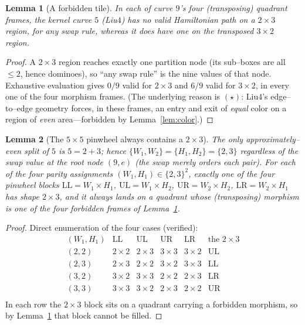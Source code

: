 \documentclass[11pt]{article}
\newtheorem{lemma}{Lemma}
\theoremstyle{definition}
\newcommand{\LL}{\mathrm{LL}}
\newcommand{\UL}{\mathrm{UL}}
\newcommand{\UR}{\mathrm{UR}}
\newcommand{\LR}{\mathrm{LR}}
\begin{document}
\begin{lemma}[A forbidden tile]\label{lem:9A}
In each of curve $9$'s four (transposing) quadrant frames, the kernel curve $5$ (Liu$4$)
has \emph{no} valid Hamiltonian path on a $2\times3$ region, for any swap rule, whereas it
\emph{does} have one on the transposed $3\times2$ region.
\end{lemma}
\begin{proof}
A $2\times3$ region reaches exactly one partition node (its sub--boxes are all $\le2$, hence
dominoes), so ``any swap rule'' is the nine values of that node. Exhaustive evaluation gives
$0/9$ valid for $2\times3$ and $6/9$ valid for $3\times2$, in every one of the four
morphism frames. (The underlying reason is $(\star)$: Liu$4$'s edge--to--edge geometry
forces, in these frames, an entry and exit of \emph{equal} color on a region of \emph{even}
area---forbidden by Lemma~\ref{lem:color}.)
\end{proof}

\begin{lemma}[The $5\times5$ pinwheel always contains a $2\times3$]\label{lem:9B}
The only approximately--even split of $5$ is $5=2+3$; hence $\{W_1,W_2\}=\{H_1,H_2\}=\{2,3\}$
regardless of the swap value at the root node $(9,e)$ (the swap merely orders each pair).
For each of the four parity assignments $(W_1,H_1)\in\{2,3\}^2$, exactly one of the four
pinwheel blocks $\LL=W_1\!\times\!H_1$, $\UL=W_1\!\times\!H_2$, $\UR=W_2\!\times\!H_2$,
$\LR=W_2\!\times\!H_1$ has shape $2\times3$, and it always lands on a quadrant whose
(transposing) morphism is one of the four forbidden frames of Lemma~\ref{lem:9A}.
\end{lemma}
\begin{proof}
Direct enumeration of the four cases (verified):
\[
\begin{array}{c|cccc|c}
(W_1,H_1) & \LL & \UL & \UR & \LR & \text{the }2\times3\\\hline
(2,2) & 2\!\times\!2 & 2\!\times\!3 & 3\!\times\!3 & 3\!\times\!2 & \UL\\
(2,3) & 2\!\times\!3 & 2\!\times\!2 & 3\!\times\!2 & 3\!\times\!3 & \LL\\
(3,2) & 3\!\times\!2 & 3\!\times\!3 & 2\!\times\!2 & 2\!\times\!3 & \LR\\
(3,3) & 3\!\times\!3 & 3\!\times\!2 & 2\!\times\!3 & 2\!\times\!2 & \UR\\
\end{array}
\]
In each row the $2\times3$ block sits on a quadrant carrying a forbidden morphism, so by
Lemma~\ref{lem:9A} that block cannot be filled.
\end{proof}
\end{document}

